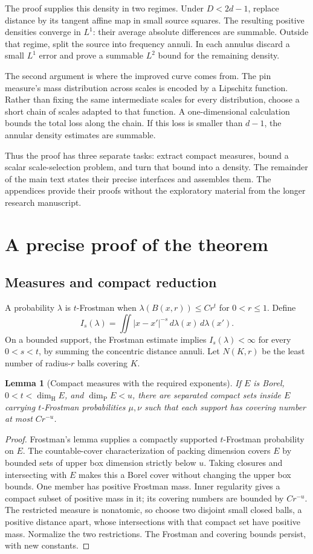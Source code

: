 \documentclass[11pt]{article}
\newtheorem{lemma}[theorem]{Lemma}
\theoremstyle{definition}\newtheorem{remark}[theorem]{Remark}
\newcommand{\HH}{\dim_{\mathrm H}}\newcommand{\PP}{\dim_{\mathrm P}}
\newcommand{\dd}{\,d}\newcommand{\norm}[1]{\left\|#1\right\|}
\begin{document}
The proof supplies this density in two regimes. Under \(D<2d-1\), replace
distance by its tangent affine map in small source squares. The resulting
positive densities converge in \(L^1\): their average absolute differences
are summable. Outside that regime, split the source into frequency annuli.
In each annulus discard a small \(L^1\) error and prove a summable
\(L^2\) bound for the remaining density.

The second argument is where the improved curve comes from. The pin measure's
mass distribution across scales is encoded by a Lipschitz function. Rather
than fixing the same intermediate scales for every distribution, choose a
short chain of scales adapted to that function. A one-dimensional calculation
bounds the total loss along the chain. If this loss is smaller than \(d-1\),
the annular density estimates are summable.

Thus the proof has three separate tasks: extract compact measures, bound a
scalar scale-selection problem, and turn that bound into a density. The
remainder of the main text states their precise interfaces and assembles them.
The appendices provide their proofs without the exploratory material from the
longer research manuscript.

\section{A precise proof of the theorem}
\subsection{Measures and compact reduction}
A probability \(\lambda\) is \(t\)-Frostman when
\(\lambda(B(x,r))\le C r^t\) for \(0<r\le1\). Define
\[
 I_s(\lambda)=\iint|x-x'|^{-s}\dd\lambda(x)\dd\lambda(x').
\]
On a bounded support, the Frostman estimate implies \(I_s(\lambda)<\infty\)
for every \(0<s<t\), by summing the concentric distance annuli.
Let \(N(K,r)\) be the least number of radius-\(r\) balls covering \(K\).

\begin{lemma}[Compact measures with the required exponents]
\label{human:compact}
If \(E\) is Borel, \(0<t<\HH E\), and \(\PP E<u\), there are separated
compact sets inside \(E\) carrying \(t\)-Frostman probabilities \(\mu,\nu\)
such that each support has covering number at most \(Cr^{-u}\).
\end{lemma}
\begin{proof}
Frostman's lemma supplies a compactly supported \(t\)-Frostman probability
on \(E\). The countable-cover characterization of packing dimension covers
\(E\) by bounded sets of upper box dimension strictly below \(u\).
Taking closures and intersecting with \(E\) makes this a Borel cover without
changing the upper box bounds. One member has positive Frostman mass.
Inner regularity gives a compact subset of positive mass in it; its covering
numbers are bounded by \(Cr^{-u}\). The restricted measure is nonatomic,
so choose two disjoint small closed balls, a positive distance apart, whose
intersections with that compact set have positive mass. Normalize the two
restrictions. The Frostman and covering bounds persist, with new constants.
\end{proof}
\end{document}
